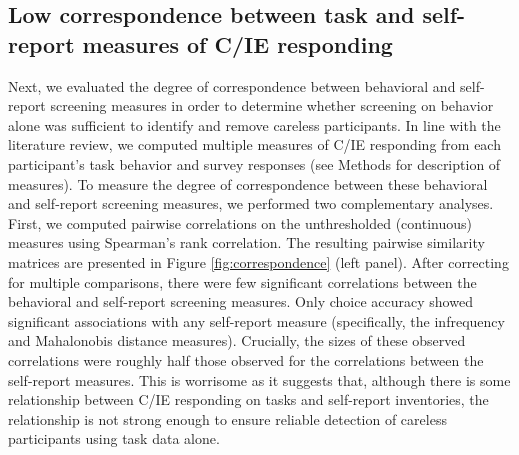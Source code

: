 \documentclass[a4paper,notitlepage,12pt]{article}
\begin{document}
\begin{refsection}[main]
\subsection*{Low correspondence between task and self-report measures of C/IE responding}

Next, we evaluated the degree of correspondence between behavioral and self-report screening measures in order to determine whether screening on behavior alone was sufficient to identify and remove careless participants. In line with the literature review, we computed multiple measures of C/IE responding from each participant's task behavior and survey responses (see Methods for description of measures). To measure the degree of correspondence between these behavioral and self-report screening measures, we performed two complementary analyses. First, we computed pairwise correlations on the unthresholded (continuous) measures using Spearman's rank correlation. The resulting pairwise similarity matrices are presented in Figure \ref{fig:correspondence} (left panel). After correcting for multiple comparisons, there were few significant correlations between the behavioral and self-report screening measures. Only choice accuracy showed significant associations with any self-report measure (specifically, the infrequency and Mahalonobis distance measures). Crucially, the sizes of these observed correlations were roughly half those observed for the correlations between the self-report measures. This is worrisome as it suggests that, although there is some relationship between C/IE responding on tasks and self-report inventories, the relationship is not strong enough to ensure reliable detection of careless participants using task data alone.


\end{refsection}
\end{document}
